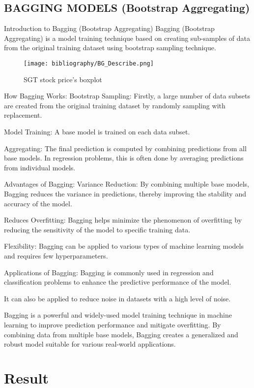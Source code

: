 \documentclass{ieeeojies}
\begin{document}
\subsection{BAGGING MODELS (Bootstrap Aggregating)}
Introduction to Bagging (Bootstrap Aggregating)
Bagging (Bootstrap Aggregating) is a model training technique based on creating sub-samples of data from the original training dataset using bootstrap sampling technique.

\begin{figure}[H]
    \centering
    \begin{minipage}{0.23\textwidth}
    \centering
    \texttt{[image: bibliography/BG\_Describe.png]}
    \caption{SGT stock price's boxplot}
    \label{fig:1}
    \end{minipage}
    \hfill
\end{figure}
How Bagging Works:
Bootstrap Sampling: Firstly, a large number of data subsets are created from the original training dataset by randomly sampling with replacement.

Model Training: A base model is trained on each data subset.

Aggregating: The final prediction is computed by combining predictions from all base models. In regression problems, this is often done by averaging predictions from individual models.

Advantages of Bagging:
Variance Reduction: By combining multiple base models, Bagging reduces the variance in predictions, thereby improving the stability and accuracy of the model.

Reduces Overfitting: Bagging helps minimize the phenomenon of overfitting by reducing the sensitivity of the model to specific training data.

Flexibility: Bagging can be applied to various types of machine learning models and requires few hyperparameters.

Applications of Bagging:
Bagging is commonly used in regression and classification problems to enhance the predictive performance of the model.

It can also be applied to reduce noise in datasets with a high level of noise.

Bagging is a powerful and widely-used model training technique in machine learning to improve prediction performance and mitigate overfitting. By combining data from multiple base models, Bagging creates a generalized and robust model suitable for various real-world applications.
\section{Result}
\end{document}
